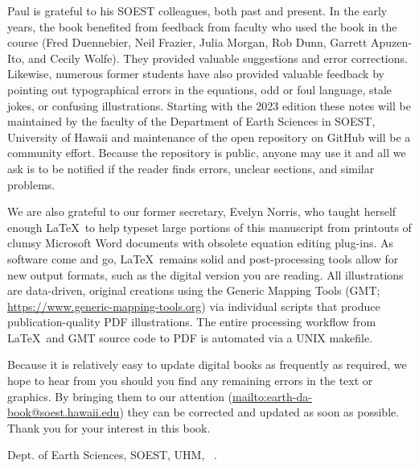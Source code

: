 Paul is grateful to his SOEST colleagues, both past and present. In the early years, the book benefited from
feedback from faculty who used the book in the course (Fred Duennebier, Neil Frazier, Julia Morgan, Rob Dunn, Garrett Apuzen-Ito, and Cecily Wolfe).  They provided valuable suggestions and error corrections.  Likewise, numerous former students have
also provided valuable feedback by pointing out typographical errors in the equations, odd or foul language,
stale jokes, or confusing illustrations.  Starting with the 2023 edition these notes will be maintained by the
faculty of the Department of Earth Sciences in SOEST, University of Hawaii and maintenance of the open
repository on GitHub will be a community effort.  Because the repository is public, anyone may use it and
all we ask is to be notified if the reader finds errors, unclear sections, and similar problems.

We are also grateful to our former secretary, Evelyn Norris,
who taught herself enough \LaTeX\ to help typeset large portions of this manuscript from printouts of clumsy Microsoft Word documents
with obsolete equation editing plug-ins.  As software come and go, \LaTeX\ remains solid and post-processing tools allow
for new output formats, such as the digital version you are reading.  All illustrations are data-driven, original creations using the
Generic Mapping Tools (GMT; \url{https://www.generic-mapping-tools.org}) via individual scripts that produce
publication-quality PDF illustrations.  The entire processing workflow from \LaTeX\ and GMT source code to PDF is automated via a UNIX makefile.

Because it is relatively easy to update digital books as frequently as required, we hope to hear from you should you find any remaining errors
in the text or graphics.  By bringing them to our attention (\url{mailto:earth-da-book@soest.hawaii.edu})
they can be corrected and updated as soon as possible.  Thank you for your interest in this book.

\vspace{2\baselineskip}
Dept. of Earth Sciences, SOEST, UHM, \DAmonth\ \DAyear.
